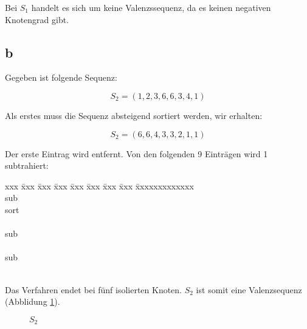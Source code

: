 \documentclass[12pt]{article}
\begin{document}
 Bei $S_1$ handelt es sich um keine Valenzssequenz, da es keinen negativen Knotengrad gibt.





\subsection*{b}
Gegeben ist folgende Sequenz:

\begin{equation*}
S_2 = (1, 2, 3, 6, 6, 3, 4, 1)
\end{equation*}

Als erstes muss die Sequenz absteigend sortiert werden, wir erhalten:

\begin{equation*}
S_2 = (6, 6, 4, 3, 3, 2, 1, 1)
\end{equation*}



\newpage




Der erste Eintrag wird entfernt. Von den folgenden 9 Einträgen wird 1 subtrahiert:


\begin{tabbing}
xxx \= xxx \= xxx \= xxx \= xxx \= xxx \= xxx \= xxx \= xxxxxxxxxxxxx                        \\
                  \> sub \\
                        \> sort \\
                        \>  \\
    \>                 \>  sub\\
    \>                      \> \\
    \>     \>                 \> sub\\
    \>     \>                   \>  \\
 \end{tabbing}

 Das Verfahren endet bei fünf isolierten Knoten. $S_2$ ist somit eine Valenzsequenz
 (Abblidung \ref{img:grafik-dumm}).

\begin{figure}[h]
	\centering
	\scalebox{.5}{}
	\caption{$S_2$}
	\label{img:grafik-dumm}
\end{figure}
\end{document}
